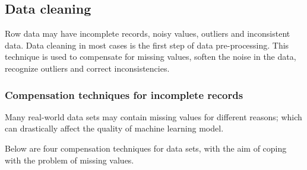\subsection{Data cleaning}

Row data may have incomplete records, noisy values, outliers and inconsistent data. Data cleaning in most cases is the first step of data pre-processing. This technique is used to compensate for missing values, soften the noise in the data, recognize outliers and correct inconsistencies.

\subsubsection{Compensation techniques for incomplete records}

Many real-world data sets may contain missing values for different reasons; which can drastically affect the quality of machine learning model.

Below are four compensation techniques for data sets, with the aim of coping with the problem of missing values.

